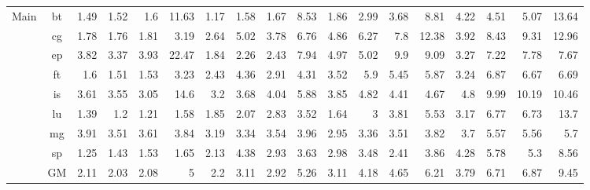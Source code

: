 \begin{table*}[]
{\begin{tabular}{|c|c|rrrr|rrrr|rrrr|rrrr|}
  \multirow{9}{*}{Main} 
 & bt &           1.49 &           1.52 &           1.6 &          11.63 &         1.17 &           1.58 &          1.67 &           8.53 &          1.86 &            2.99 &           3.68 &            8.81 &           4.22 &            4.51 &           5.07 &           13.64 \\
 & cg &           1.78 &           1.76 &          1.81 &           3.19 &         2.64 &           5.02 &          3.78 &           6.76 &          4.86 &            6.27 &            7.8 &           12.38 &           3.92 &            8.43 &           9.31 &           12.96 \\
 & ep &           3.82 &           3.37 &          3.93 &          22.47 &         1.84 &           2.26 &          2.43 &           7.94 &          4.97 &            5.02 &            9.9 &            9.09 &           3.27 &            7.22 &           7.78 &            7.67 \\
 & ft &            1.6 &           1.51 &          1.53 &           3.23 &         2.43 &           4.36 &          2.91 &           4.31 &          3.52 &             5.9 &           5.45 &            5.87 &           3.24 &            6.87 &           6.67 &            6.69 \\
 & is &           3.61 &           3.55 &          3.05 &           14.6 &          3.2 &           3.68 &          4.04 &           5.88 &          3.85 &            4.82 &           4.41 &            4.67 &            4.8 &            9.99 &          10.19 &           10.46 \\
 & lu &           1.39 &            1.2 &          1.21 &           1.58 &         1.85 &           2.07 &          2.83 &           3.52 &          1.64 &               3 &           3.81 &            5.53 &           3.17 &            6.77 &           6.73 &            13.7 \\
 & mg &           3.91 &           3.51 &          3.61 &           3.84 &         3.19 &           3.34 &          3.54 &           3.96 &          2.95 &            3.36 &           3.51 &            3.82 &            3.7 &            5.57 &           5.56 &             5.7 \\
 & sp &           1.25 &           1.43 &          1.53 &           1.65 &         2.13 &           4.38 &          2.93 &           3.63 &          2.98 &            3.48 &           2.41 &            3.86 &           4.28 &            5.78 &            5.3 &            8.56 \\ \cline{2-18}
 & GM &           2.11 &           2.03 &          2.08 &              5 &          2.2 &           3.11 &          2.92 &           5.26 &          3.11 &            4.18 &           4.65 &            6.21 &           3.79 &            6.71 &           6.87 &            9.45 \\ \hline
\end{tabular}
}
\end{table*}